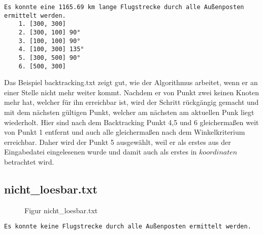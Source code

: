 \documentclass[a4paper,10pt,ngerman]{scrartcl}
\begin{document}
    \begin{lstlisting}[frame=single, title=Programmausgabe backtracking.txt, breaklines=true,label={lst:lstlisting13}]
    Es konnte eine 1165.69 km lange Flugstrecke durch alle Außenposten ermittelt werden.
    1. [300, 300]
    2. [300, 100] 90°
    3. [100, 100] 90°
    4. [100, 300] 135°
    5. [300, 500] 90°
    6. [500, 300]
    \end{lstlisting}

    Das Beispiel backtracking.txt zeigt gut, wie der Algorithmus arbeitet, wenn er an einer Stelle nicht mehr weiter kommt.
    Nachdem er von Punkt zwei keinen Knoten mehr hat, welcher für ihn erreichbar ist, wird der Schritt rückgängig gemacht
    und mit dem nächsten gültigen Punkt, welcher am nächsten am aktuellen Punk liegt wiederholt.
    Hier sind nach dem Backtracking Punkt 4,5 und 6 gleichermaßen weit von Punkt 1 entfernt
    und auch alle gleichermaßen nach dem Winkelkriterium erreichbar.
    Daher wird der Punkt 5 ausgewählt, weil er als erstes aus der Eingabedatei eingelesenen wurde und damit auch als erstes in $koordinaten$ betrachtet wird.
    \subsection{nicht\_loesbar.txt}\label{subsec:nichtloesbar.txt}


    \begin{figure}[H]
        \centering
        \caption{Figur nicht\_loesbar.txt}
        \label{fig:Figure4}
    \end{figure}

    \begin{lstlisting}[frame=single, title=Programmausgabe nicht\_loesbar.txt, breaklines=true,label={lst:lstlisting5}]
    Es konnte keine Flugstrecke durch alle Außenposten ermittelt werden.
    \end{lstlisting}
\end{document}
